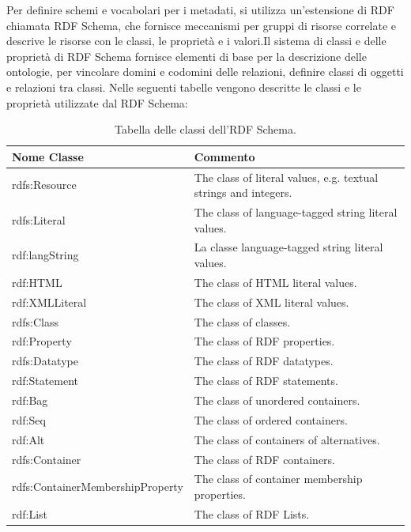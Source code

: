 \documentclass[a4paper,11pt]{article}
\begin{document}
Per definire schemi e vocabolari per i metadati, si utilizza un'estensione di RDF chiamata RDF Schema, che fornisce meccanismi per gruppi di risorse correlate e descrive le risorse con le classi, le proprietà e i valori.\newline Il sistema di classi e delle proprietà di RDF Schema fornisce elementi di base per la descrizione delle ontologie, per vincolare domini e codomini delle relazioni, definire classi di oggetti e relazioni tra classi.
Nelle seguenti tabelle vengono descritte le classi e le proprietà utilizzate dal RDF Schema:	\newline		
\begin{table}[!htb]
\begin{center}				
\begin{tabular}{|>{\small}l|>{\small}l|}
	\hline
	\textbf{Nome Classe} & \textbf{Commento}\\				
	\hline 	rdfs:Resource & The class of literal values, e.g. textual strings and integers.\\	
	\hline rdfs:Literal & 	The class of language-tagged string literal values.\\ 			\hline rdf:langString & La classe  language-tagged string literal values.\\			\hline rdf:HTML &	The class of HTML literal values.\\
	\hline rdf:XMLLiteral	& The class of XML literal values.\\
	\hline rdfs:Class & The class of classes.\\
	\hline rdf:Property & The class of RDF properties.\\
	\hline rdfs:Datatype &	The class of RDF datatypes.\\
	\hline rdf:Statement & The class of RDF statements.\\
	\hline rdf:Bag	& The class of unordered containers.\\
	\hline rdf:Seq	& The class of ordered containers.\\
	\hline rdf:Alt	& The class of containers of alternatives.\\
	\hline rdfs:Container & The class of RDF containers.\\
	\hline rdfs:ContainerMembershipProperty & The class of container membership properties.\\
	\hline rdf:List &	The class of RDF Lists.\\
	\hline			
\end{tabular}	
\caption{Tabella delle classi dell'RDF Schema.}	
\end{center}	
\end{table}
\end{document}
